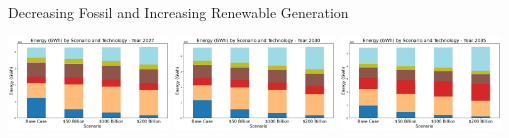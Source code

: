 \documentclass{beamer}
\begin{document}
\begin{frame}{Decreasing Fossil and Increasing Renewable Generation}
\begin{adjustwidth}{-3em}{-1.5em}

    \centering
    \begin{minipage}{1.1\textwidth}
        \centering
        \includegraphics[width=0.32\textwidth]{Figures/EndogenousPaper/Dispatch_Relative_by_scenario_2027.png} \hfill
        \includegraphics[width=0.32\textwidth]{Figures/EndogenousPaper/Dispatch_Relative_by_scenario_2030.png} \hfill
        \includegraphics[width=0.32\textwidth]{Figures/EndogenousPaper/Dispatch_Relative_by_scenario_2035.png}
    \end{minipage}
    
    \vspace{0.5cm}
    

\end{adjustwidth}
\end{frame}
\end{document}
